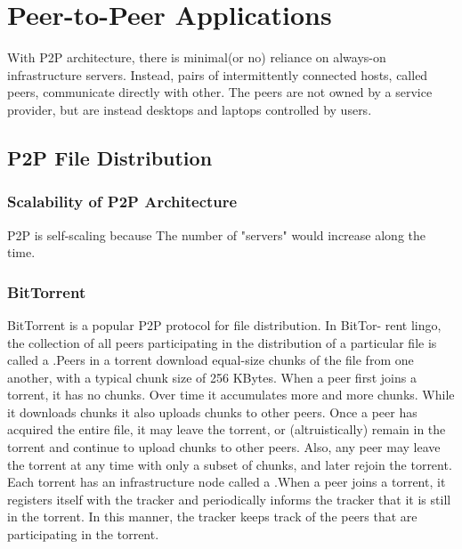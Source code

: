 \newpage
\section{Peer-to-Peer Applications}

\hf With P2P architecture, there is minimal(or no) reliance on always-on infrastructure servers.
Instead, pairs of intermittently connected hosts, called peers, communicate
directly with other. The peers are not owned by a service provider, but are instead desktops and laptops
controlled by users.

\subsection{P2P File Distribution}

\subsubsection{Scalability of P2P Architecture}

\hf P2P is self-scaling because 
The number of "servers" would increase along the time.




\subsubsection{BitTorrent}

\hf BitTorrent is a popular P2P protocol for file distribution. In BitTor-
rent lingo, the collection of all peers participating in the distribution of a particular
file is called a .Peers in a torrent download equal-size chunks of the file
from one another, with a typical chunk size of 256 KBytes. When a peer first joins
a torrent, it has no chunks. Over time it accumulates more and more chunks. While
it downloads chunks it also uploads chunks to other peers. Once a peer has
acquired the entire file, it may leave the torrent, or (altruistically) remain
in the torrent and continue to upload chunks to other peers. Also, any peer may leave
the torrent at any time with only a subset of chunks, and later rejoin the torrent.\\


Each torrent has an infrastructure node called a .When a peer joins a torrent, it registers itself with the tracker and periodically
informs the tracker that it is still in the torrent. In this manner, the tracker keeps
track of the peers that are participating in the torrent.\\

